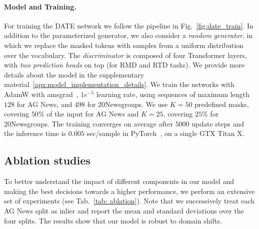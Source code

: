 \documentclass[11pt]{article}
\begin{document}
\paragraph{Model and Training.} For training the DATE network we follow the pipeline in Fig.~\ref{fig:date_train}. In addition to the parameterized generator, we also consider a \emph{random generator}, in which we replace the masked tokens with samples from a uniform distribution over the vocabulary.
The \emph{discriminator} is composed of four Transformer layers, with \emph{two prediction heads} on top (for RMD and RTD tasks). We provide more details about the model in the supplementary material~\ref{apx:model_implementation_details}. We train the networks with AdamW with amsgrad~\cite{adamw-amsgrad}, $1e^{-5}$ learning rate, using sequences of maximum length $128$ for AG News, and $498$ for 20Newsgroups. We use $K=50$ predefined masks, covering $50\%$ of the input for AG News and $K=25$, covering $25\%$ for 20Newsgroups. The training converges on average after $5000$ update steps and the inference time is $0.005$ sec/sample in PyTorch~\cite{pytorch}, on a single GTX Titan X.



\subsection{Ablation studies}
\label{sec: ex-ablation}
To better understand the impact of different components in our model and making the best decisions towards a higher performance, we perform an extensive set of experiments (see Tab.~\ref{tab: ablation}). Note that we successively treat each AG News split as inlier and report the mean and standard deviations over the four splits. The results show that our model is robust to domain shifts.
\end{document}
